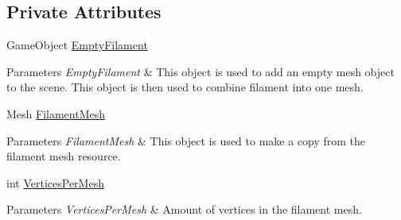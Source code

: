 \subsection*{Private Attributes}
\begin{DoxyCompactItemize}
\item 
\mbox{\label{class_filament_manager_a5e5d2ab663216f296edbf4b408c77b10}} 
Game\+Object \hyperlink{class_filament_manager_a5e5d2ab663216f296edbf4b408c77b10}{Empty\+Filament}
\begin{DoxyCompactList}\small\item\em 
\begin{DoxyParams}{Parameters}
{\em Empty\+Filament} & This object is used to add an empty mesh object to the scene. This object is then used to combine filament into one mesh.\\
\hline
\end{DoxyParams}
\end{DoxyCompactList}\item 
\mbox{\label{class_filament_manager_ae127047f9f8d605818d2543182b9967a}} 
Mesh \hyperlink{class_filament_manager_ae127047f9f8d605818d2543182b9967a}{Filament\+Mesh}
\begin{DoxyCompactList}\small\item\em 
\begin{DoxyParams}{Parameters}
{\em Filament\+Mesh} & This object is used to make a copy from the filament mesh resource.\\
\hline
\end{DoxyParams}
\end{DoxyCompactList}\item 
\mbox{\label{class_filament_manager_a8a828b6fbdf60b77008801299aa6c71d}} 
int \hyperlink{class_filament_manager_a8a828b6fbdf60b77008801299aa6c71d}{Vertices\+Per\+Mesh}
\begin{DoxyCompactList}\small\item\em 
\begin{DoxyParams}{Parameters}
{\em Vertices\+Per\+Mesh} & Amount of vertices in the filament mesh.\\
\hline
\end{DoxyParams}
\end{DoxyCompactList}\item 
\mbox{\label{class_filament_manager_a9401bd69ba21204265cd78a9a94e5b25}} 

\end{DoxyCompactItemize}
